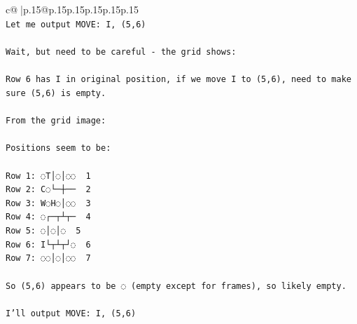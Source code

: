 \documentclass{article}
\begin{document}
{\begin{supertabular}{c@{$\;$}|p{.15\linewidth}@{}p{.15\linewidth}p{.15\linewidth}p{.15\linewidth}p{.15\linewidth}p{.15\linewidth}}
{{{\\ 
\texttt{Let me output MOVE: I, (5,6)} \\
\\ 
\texttt{Wait, but need to be careful {-} the grid shows:} \\
\\ 
\texttt{Row 6 has I in original position, if we move I to (5,6), need to make sure (5,6) is empty.} \\
\\ 
\texttt{From the grid image:} \\
\\ 
\texttt{Positions seem to be:} \\
\\ 
\texttt{Row 1: ◌T│◌│◌◌  1} \\
\texttt{Row 2: C◌└─┼──  2} \\
\texttt{Row 3: W◌H◌│◌◌  3} \\
\texttt{Row 4: ◌┌─┬┴┬─  4} \\
\texttt{Row 5: ◌│◌│◌  5} \\
\texttt{Row 6: I└┬┴┬┘◌  6} \\
\texttt{Row 7: ◌◌│◌│◌◌  7} \\
\\ 
\texttt{So (5,6) appears to be ◌ (empty except for frames), so likely empty.} \\
\\ 
\texttt{I'll output MOVE: I, (5,6)} \\
            }
        }
    }
     \\ \\


\end{supertabular}}
\end{document}
